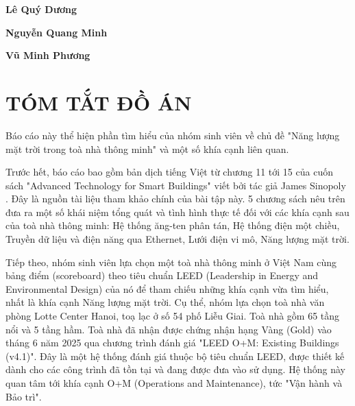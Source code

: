 \documentclass{thesis}
\begin{document}
\hspace{9.25cm}\textbf{Lê Quý Dương} %

\hspace{9.25cm}\textbf{Nguyễn Quang Minh} %

\hspace{9.25cm}\textbf{Vũ Minh Phương} %

\newpage %

\section*{TÓM TẮT ĐỒ ÁN}
\thispagestyle{empty}

Báo cáo này thể hiện phần tìm hiểu của nhóm sinh viên về chủ đề "Năng
lượng mặt trời trong toà nhà thông minh" và một số khía cạnh liên
quan.

Trước hết, báo cáo bao gồm bản dịch tiếng Việt từ chương 11 tới
15 của cuốn sách
"Advanced Technology for Smart Buildings" viết bởi tác giả James Sinopoly
\cite{sinopoli2016advanced}. Đây là nguồn tài liệu tham khảo chính
của bài tập này. 5 chương sách nêu trên đưa ra một số khái niệm tổng
quát và tình hình thực tế đối với các khía cạnh sau của toà nhà thông
minh: Hệ thống ăng-ten phân
tán, Hệ thống điện một chiều, Truyền dữ liệu và điện năng qua
Ethernet, Lưới điện vi mô, Năng lượng mặt trời.

Tiếp theo, nhóm sinh viên lựa chọn một toà nhà thông minh ở Việt Nam
cùng bảng điểm (scoreboard) theo tiêu chuẩn LEED (Leadership in
Energy and Environmental Design) của nó để tham chiếu những khía cạnh
vừa tìm hiểu, nhất là khía cạnh Năng lượng mặt trời. Cụ thể, nhóm
lựa chọn toà nhà văn phòng Lotte Center Hanoi, toạ lạc ở số 54 phố
Liễu Giai. Toà nhà gồm 65 tầng nổi và 5 tầng hầm. Toà nhà đã nhận được
chứng nhận hạng Vàng (Gold) vào tháng 6 năm 2025 qua chương trình
đánh giá "LEED O+M: Existing Buildings (v4.1)". Đây là một hệ thống
đánh giá thuộc bộ tiêu chuẩn LEED, được thiết kế dành cho các công
trình đã tồn tại và đang được đưa vào sử dụng. Hệ thống này quan tâm
tới khía cạnh O+M (Operations and Maintenance), tức "Vận hành và Bảo trì".

\thispagestyle{empty}
\cleardoublepage

\tableofcontents
\thispagestyle{empty}
\newpage
\end{document}
